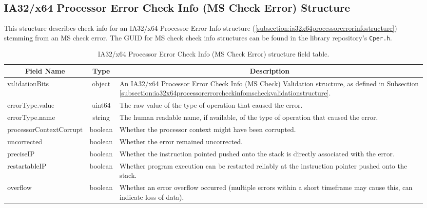 \documentclass{report}
\newcommand*{\thead}[1]{\multicolumn{1}{|c|}{\bfseries #1}}
\newcommand*{\jsontable}[1]{
    \begin{table}[!ht]
    \label{#1}
    \centering
    \begin{adjustbox}{center}
    \begin{tabular}{|l|c|p{8cm}|}
    \hline
    \thead{Field Name} & \thead{Type} & \thead{Description} \\
    \hline
}
\newcommand*{\jsontableend}[1]{
    \hline
    \end{tabular}
    \end{adjustbox}
    \caption{#1}
    \label{table:#1}
    \end{table}
    \FloatBarrier
}
\begin{document}
\subsection{IA32/x64 Processor Error Check Info (MS Check Error) Structure}
\label{subsection:ia32x64processorerrorcheckinfomscheckstructure}
This structure describes check info for an IA32/x64 Processor Error Info structure (\ref{subsection:ia32x64processorerrorinfostructure}) stemming from an MS check error.
The GUID for MS check check info structures can be found in the library repository's \texttt{Cper.h}.
\jsontable{table:ia32x64processorerrorcheckinfomscheckstructure}
validationBits & object & An IA32/x64 Processor Error Check Info (MS Check) Validation structure, as defined in Subsection \ref{subsection:ia32x64processorerrorcheckinfomscheckvalidationstructure}.\\
\hline
errorType.value & uint64 & The raw value of the type of operation that caused the error.\\
errorType.name & string & The human readable name, if available, of the type of operation that caused the error.\\
\hline
processorContextCorrupt & boolean & Whether the processor context might have been corrupted.\\
\hline
uncorrected & boolean & Whether the error remained uncorrected.\\
\hline
preciseIP & boolean & Whether the instruction pointed pushed onto the stack is directly associated with the error.\\
\hline
restartableIP & boolean & Whether program execution can be restarted reliably at the instruction pointer pushed onto the stack.\\
\hline
overflow & boolean & Whether an error overflow occurred (multiple errors within a short timeframe may cause this, can indicate loss of data).\\
\jsontableend{IA32/x64 Processor Error Check Info (MS Check Error) structure field table.}

\end{document}
